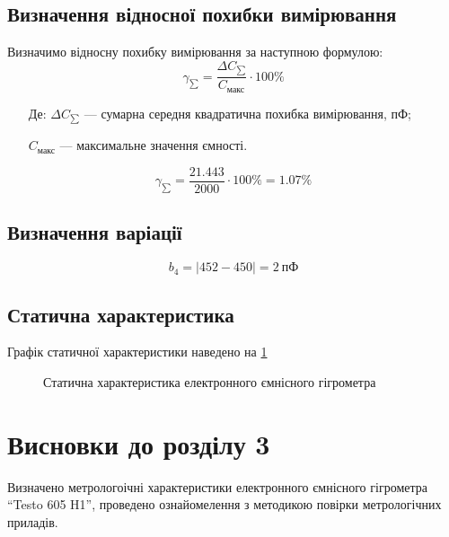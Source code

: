 \subsection{Визначення відносної похибки вимірювання}
Визначимо відносну похибку вимірювання за наступною формулою:
\begin{equation}
    \gamma_{\sum} = \frac{\Delta C_{\sum}}{C_{\text{макс}}} \cdot 100\%
\end{equation}
\begin{itemize}
\item [Де:] $\Delta C_{\sum}$ --- сумарна середня квадратична похибка вимірювання, пФ;
\item []$C_{\text{макс}}$ ---  максимальне значення ємності.
\end{itemize}
\begin{equation}
    \gamma_{\sum} = \frac{21.443}{2000} \cdot 100\%= 1.07\%
\end{equation}

\subsection{Визначення варіації}
\begin{equation}
    b_4 = |452 - 450| = 2~\text{пФ}
\end{equation}
\subsection{Статична характеристика}

Графік статичної характеристики наведено на \ref{fig:static_c}

\begin{figure}[htb]
\caption{Статична характеристика електронного ємнісного гігрометра}
 \label{fig:static_c}
\end{figure}
\newpage
\section*{Висновки до розділу 3}

Визначено метрологоічні характеристики електронного ємнісного гігрометра ``Testo 605 H1'', проведено
ознайомелення з методикою повірки метрологічних приладів.
